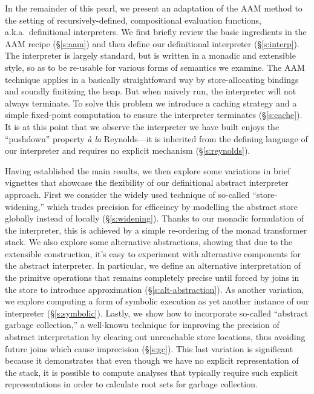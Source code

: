 In the remainder of this pearl, we present an adaptation of the AAM
method to the setting of recursively-defined, compositional evaluation
functions, a.k.a.~definitional interpreters.  We first briefly review
the basic ingredients in the AAM recipe (\S\ref{s:aam}) and then
define our definitional interpreter (\S\ref{s:interp}).  The
interpreter is largely standard, but is written in a monadic and
extensible style, so as to be re-usable for various forms of semantics
we examine.  The AAM technique applies in a basically straightfoward
way by store-allocating bindings and soundly finitizing the heap.  But
when naively run, the interpreter will not always terminate.  To solve
this problem we introduce a caching strategy and a simple fixed-point
computation to ensure the interpreter terminates (\S\ref{s:cache}).
It is at this point that we observe the interpreter we have built
enjoys the ``pushdown'' property \emph{\`a la} Reynolds---it is
inherited from the defining language of our interpreter and requires
no explicit mechanism (\S\ref{s:reynolds}).

Having established the main results, we then explore some variations
in brief vignettes that showcase the flexibility of our definitional
abstract interpreter approach.  First we consider the widely used
technique of so-called ``store-widening,'' which trades precision for
efficeincy by modelling the abstract store globally instead of locally
(\S\ref{s:widening}).  Thanks to our monadic formulation of the
interpreter, this is achieved by a simple re-ordering of the monad
transformer stack.  We also explore some alternative abstractions,
showing that due to the extensible construction, it's easy to
experiment with alternative components for the abstract interpreter.
In particular, we define an alternative interpretation of the primitve
operations that remains completely precise until forced by joins in
the store to introduce approximation (\S\ref{s:alt-abstraction}).  As
another variation, we explore computing a form of symbolic execution
as yet another instance of our interpreter (\S\ref{s:symbolic}).  Lastly, we
show how to incorporate so-called ``abstract garbage collection,'' a
well-known technique for improving the precision of abstract
interpretation by clearing out unreachable store locations, thus
avoiding future joins which cause imprecision (\S\ref{s:gc}).  This
last variation is significant because it demonstrates that even though
we have no explicit representation of the stack, it is possible to
compute analyses that typically require such explicit representations
in order to calculate root sets for garbage collection.

